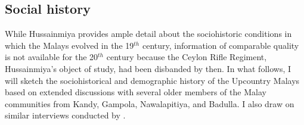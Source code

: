 








\subsection{Social history}\label{sec:slmbg:DemographicpostcolonialHistory}
While Hussainmiya provides ample detail about the sociohistoric conditions in which the Malays evolved in the 19$^{th}$ century, information of comparable quality is not available for the 20$^{th}$ century because the Ceylon Rifle Regiment, Hussainmiya's object of study, had been disbanded by then. In what follows, I will sketch the sociohistorical and demographic history of the Upcountry Malays based on extended discussions with several older members of the Malay communities from Kandy, Gampola, Nawalapitiya, and Badulla. I also draw on similar interviews conducted by \citet{Bichsel}.

